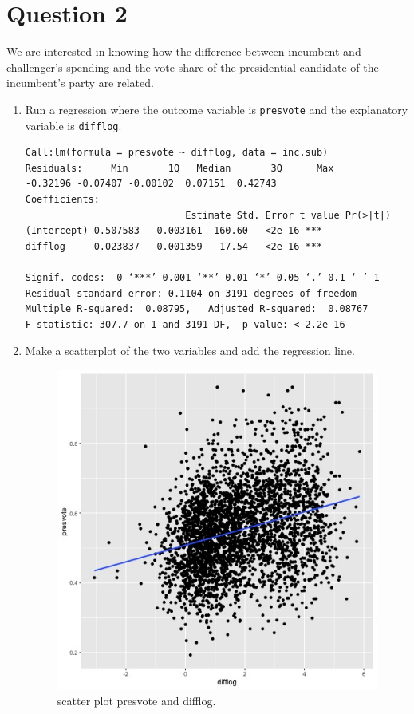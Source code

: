 \documentclass[12pt,letterpaper]{article}
\begin{document}
\newpage

\section*{Question 2}
\noindent We are interested in knowing how the difference between incumbent and challenger's spending and the vote share of the presidential candidate of the incumbent's party are related.	\vspace{.25cm}
	\begin{enumerate}
		\item Run a regression where the outcome variable is \texttt{presvote} and the explanatory variable is \texttt{difflog}.
 	
\begin{verbatim}
Call:lm(formula = presvote ~ difflog, data = inc.sub)
Residuals:     Min       1Q   Median       3Q      Max 
-0.32196 -0.07407 -0.00102  0.07151  0.42743 
Coefficients:            
							Estimate Std. Error t value Pr(>|t|)    
(Intercept) 0.507583   0.003161  160.60   <2e-16 ***
difflog     0.023837   0.001359   17.54   <2e-16 ***
---
Signif. codes:  0 ‘***’ 0.001 ‘**’ 0.01 ‘*’ 0.05 ‘.’ 0.1 ‘ ’ 1
Residual standard error: 0.1104 on 3191 degrees of freedom
Multiple R-squared:  0.08795,	Adjusted R-squared:  0.08767 
F-statistic: 307.7 on 1 and 3191 DF,  p-value: < 2.2e-16
\end{verbatim} 	
		\item Make a scatterplot of the two variables and add the regression line. 
 	\vspace{7cm}
	\begin{figure}[h!]\centering
		\caption{\footnotesize scatter plot presvote and difflog.}
		\label{fig:plot_2}
		\includegraphics[width=.75\textwidth]{presvote_difflog.jpeg}
	\end{figure}


\end{enumerate}
\end{document}
